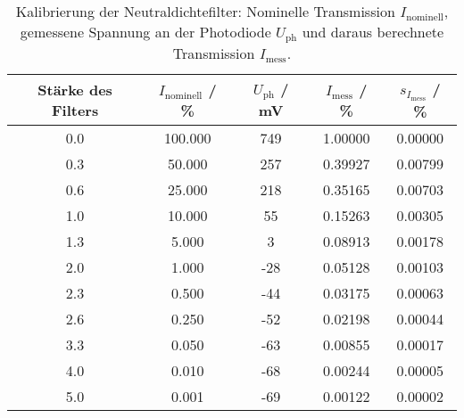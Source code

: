 \begin{table}[H]
\caption{Kalibrierung der Neutraldichtefilter: Nominelle Transmission $I_{\text{nominell}}$, gemessene Spannung an der Photodiode $U_{\text{ph}}$ und daraus berechnete Transmission $I_{\text{mess}}$. }
\begin{center}
\begin{tabular}{|c|c|c|c|c|}
  \hline
  Stärke des Filters & $I_\text{nominell}$ / \% & $U_\text{ph}$ / mV & $I_\text{mess}$ / \% & $s_{I_\text{mess}}$ / \% \\ \hline
  0.0 & 100.000 & 749 & 1.00000 & 0.00000 \\ \hline
  0.3 & 50.000 & 257 & 0.39927 & 0.00799 \\ \hline
  0.6 & 25.000 & 218 & 0.35165 & 0.00703 \\ \hline
  1.0 & 10.000 & 55 & 0.15263 & 0.00305 \\ \hline
  1.3 & 5.000 & 3 & 0.08913 & 0.00178 \\ \hline
  2.0 & 1.000 & -28 & 0.05128 & 0.00103 \\ \hline
  2.3 & 0.500 & -44 & 0.03175 & 0.00063 \\ \hline
  2.6 & 0.250 & -52 & 0.02198 & 0.00044 \\ \hline
  3.3 & 0.050 & -63 & 0.00855 & 0.00017 \\ \hline
  4.0 & 0.010 & -68 & 0.00244 & 0.00005 \\ \hline
  5.0 & 0.001 & -69 & 0.00122 & 0.00002 \\ \hline
\end{tabular}
\end{center}
\label{tab:deh:dnfilter}
\end{table}
